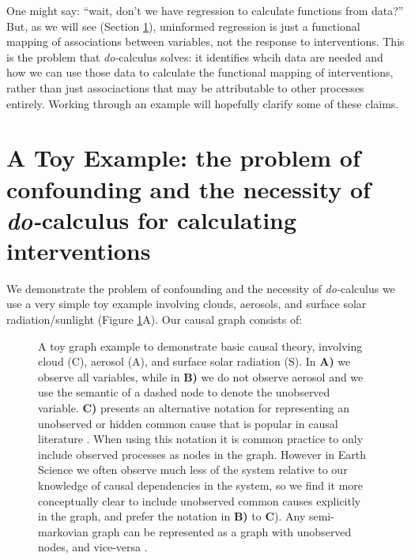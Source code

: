 \documentclass[12pt]{article}
\begin{document}
One might say: ``wait, don't we have regression to calculate functions
from data?'' But, as we will see (Section
\ref{sec:causal-graphs-pearls}), uninformed regression is just a
functional mapping of associations between variables, not the response
to interventions. This is the problem that \textit{do-}calculus
solves: it identifies whcih data are needed and how we can use those
data to calculate the functional mapping of interventions, rather than
just associactions that may be attributable to other processes
entirely. Working through an example will hopefully clarify some of
these claims.

\section{A Toy Example: the problem of confounding and the necessity
  of \textit{do-}calculus for calculating interventions}
\label{sec:causal-graphs-pearls}

We demonstrate the problem of confounding and the necessity of
\textit{do-}calculus we use a very simple toy example involving
clouds, aerosols, and surface solar radiation/sunlight (Figure
\ref{fig:toy}A). Our causal graph consists of:

\begin{figure}
  \scalebox{1.0}{}
  \caption{A toy graph example to demonstrate basic causal theory,
    involving cloud (C), aerosol (A), and surface solar radiation
    (S). In \textbf{A)} we observe all variables, while in \textbf{B)}
    we do not observe aerosol and we use the semantic of a dashed node
    to denote the unobserved variable. \textbf{C)} presents an
    alternative notation for representing an unobserved or hidden
    common cause that is popular in causal literature \citep[e.g.,
    ``semi-markovian graphs'',][]{shpitser2006}. When using this
    notation it is common practice to only include observed processes
    as nodes in the graph. However in Earth Science we often observe
    much less of the system relative to our knowledge of causal
    dependencies in the system, so we find it more conceptually clear
    to include unobserved common causes explicitly in the graph, and
    prefer the notation in \textbf{B)} to \textbf{C}). Any
    semi-markovian graph can be represented as a graph with unobserved
    nodes, and vice-versa \citep[e.g.,][]{lee2019structural}.}
  \label{fig:toy}
\end{figure}
\end{document}
